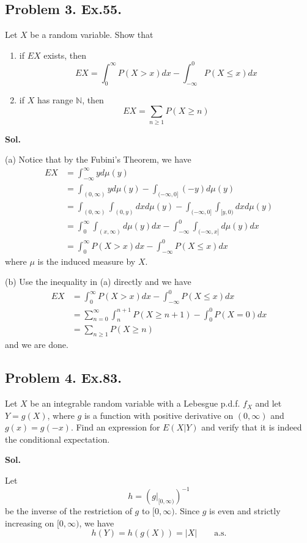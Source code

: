 \documentclass[lang=en,11pt,a4paper,citestyle=authoryear]{elegantpaper}
\newcommand{\N}{\mathbb{N}}
\begin{document}
\subsection*{Problem 3. Ex.55.}
Let $X$ be a random variable. Show that
\begin{enumerate}[label=(\arabic*),leftmargin=*]
    \item[(a)] if $EX$ exists, then
      \[
      EX = \int_0^{\infty} P(X > x)dx - \int_{-\infty}^0 P(X\leq x) dx
      \]
    \item[(b)] if $X$ has range $\N$, then \[EX = \sum\limits_{n\geq 1} P(X\geq n)\]
\end{enumerate}
\vspace{0.5em}
\textbf{Sol.}\par
(a) Notice that by the Fubini's Theorem, we have
\[
\begin{aligned}
  EX &= \int_{-\infty}^{\infty} yd\mu(y) \\
  &= \int_{(0,\infty)} yd\mu(y) - \int_{(-\infty,0]} (-y)d\mu(y)\\
  &= \int_{(0,\infty)} \int_{(0,y)} dx d\mu(y) - \int_{(-\infty,0]} \int_{[y,0)} dx d\mu(y) \\
  &= \int_0^{\infty} \int_{(x,\infty)} d\mu(y)dx - \int_{-\infty}^0 \int_{(-\infty,x]} d\mu(y)dx     \\
  &= \int_0^{\infty} P(X>x) dx - \int^0_{-\infty}P(X\leq x)dx
\end{aligned}
\]
where $\mu$ is the induced measure by $X$.\par
(b) Use the inequality in (a) directly and we have
\[
\begin{aligned}
  EX &= \int_0^{\infty} P(X>x) dx - \int^0_{-\infty}P(X\leq x)dx \\
  &= \sum\limits_{n=0}^{\infty} \int_n^{n+1} P(X \geq n+1) - \int_0^0 P(X = 0) dx \\
  &= \sum\limits_{n\geq 1} P(X\geq n)
\end{aligned}
\]
and we are done.
\vspace{0.5em}

\subsection*{Problem 4. Ex.83.}
 Let $X$ be an integrable random variable with a Lebesgue p.d.f. $f_X$
and let $Y = g(X)$, where $g$ is a function with positive derivative on $(0,\infty)$ and $g(x) = g(-x)$. Find an expression for $E(X|Y)$ and verify
that it is indeed the conditional expectation.\par
\vspace{0.5em}
\textbf{Sol.}\par
Let
\[
h=\left(g\big|_{[0,\infty)}\right)^{-1}
\]
be the inverse of the restriction of $g$ to $[0,\infty)$. Since $g$ is even
and strictly increasing on $[0,\infty)$, we have
\[
h(Y)=h(g(X))=|X|
\qquad \text{a.s.}
\]
\end{document}
